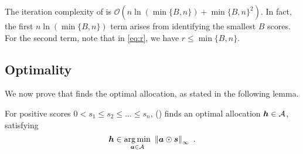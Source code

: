 \begin{remark}
    The iteration complexity of  is $\mathcal{O}(n \ln(\min\{B, n\}) + \min\{B, n\}^2)$. In fact, the first $n \ln(\min\{B, n\})$ term arises from identifying the smallest $B$ scores. For the second term, note that in \eqref{eq:r}, we have $r \leq \min\{B, n\}$.
\end{remark}

\subsection{Optimality}
We now prove that  finds the optimal allocation, as stated in the following lemma.
\begin{lemma}
    \label{thm:RAS_optimality}
    For positive scores $0<s_1 \le s_2 \le \ldots \le s_n$,  () finds an optimal allocation $\bm{h} \in \mathcal{A}$, satisfying
    $$
    \bm{h} \in \operatorname*{arg\,min}_{\bm{a} \in \mathcal{A}} \  \left\| \bm{a} \odot \bm{s} \right\|_{\infty} ~.
    $$
\end{lemma}
%
